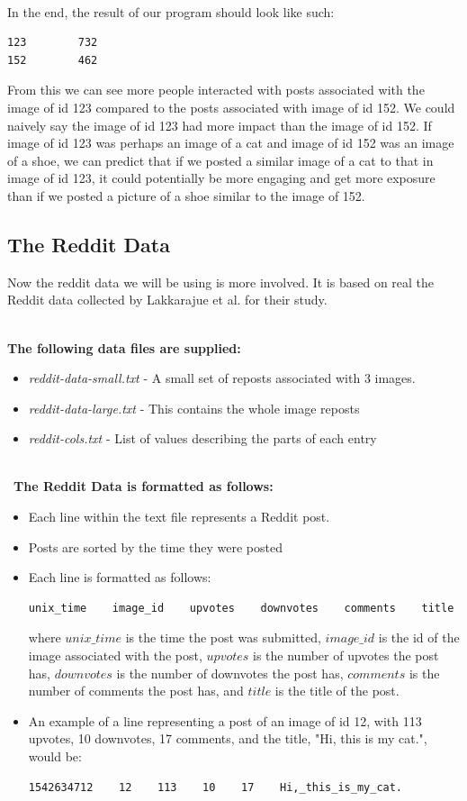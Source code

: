 \documentclass{article}
\begin{document}
\-\ \\In the end, the result of our program should look like such:
\begin{lstlisting}[language=bash]
123        732
152        462
\end{lstlisting}
From this we can see more people interacted with posts associated with the  image of id 123 compared to the posts associated with image of id 152. We could naively say the image of id 123 had more impact than the image of id 152. If image of id 123 was perhaps an image of a cat and image of id 152 was an image of a shoe, we can predict that if we posted a similar image of a cat to that in image of id 123, it could potentially be more engaging and get more exposure than if we posted a picture of a shoe similar to the image of 152.

\subsection*{The Reddit Data}
Now the reddit data we will be using is more involved. It is based on real the Reddit data collected by Lakkarajue et al. for their study.

\-\ \\ \textbf{The following data files are supplied:}
\begin{itemize}
    \item \textit{reddit-data-small.txt} - A small set of reposts associated with 3 images.
    \item \textit{reddit-data-large.txt} - This contains the whole image reposts
    \item \textit{reddit-cols.txt} - List of values describing the parts of each entry
\end{itemize}

\-\\\ \textbf{The Reddit Data is formatted as follows:}
\begin{itemize}
    \item Each line within the text file represents a Reddit post. 
    \item Posts are sorted by the time they were posted
    \item Each line is formatted as follows: 
             \begin{lstlisting}[language=bash]
 unix_time    image_id    upvotes    downvotes    comments    title
             \end{lstlisting}
             where $unix\_time$ is the time the post was submitted, $image\_id$ is the id of the image associated with the post, $upvotes$ is the number of upvotes the post has, $downvotes$ is the number of downvotes the post has, $comments$ is the number of comments the post has, and $title$ is the title of the post. 
    \item An example of a line representing a post of an image of id 12, with 113 upvotes, 10 downvotes, 17 comments, and the title, "Hi, this is my cat.", would be: 
                 \begin{lstlisting}[language=bash]
 1542634712    12    113    10    17    Hi,_this_is_my_cat.
             \end{lstlisting}
\end{itemize}
\end{document}
